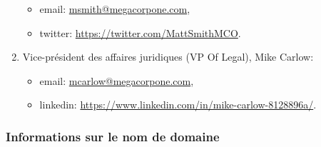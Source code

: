 \documentclass[french,oneside]{article}
\begin{document}
\begin{enumerate}
\begin{itemize}
        \item email: \url{msmith@megacorpone.com},
        \item twitter: \url{https://twitter.com/MattSmithMCO}.
    \end{itemize}
    \item Vice-président des affaires juridiques (VP Of Legal), Mike Carlow:
    \begin{itemize}
        \item email: \url{mcarlow@megacorpone.com},
        \item linkedin: \url{https://www.linkedin.com/in/mike-carlow-8128896a/}.
    \end{itemize}
\end{enumerate}



\subsubsection{Informations sur le nom de domaine}
\end{document}
